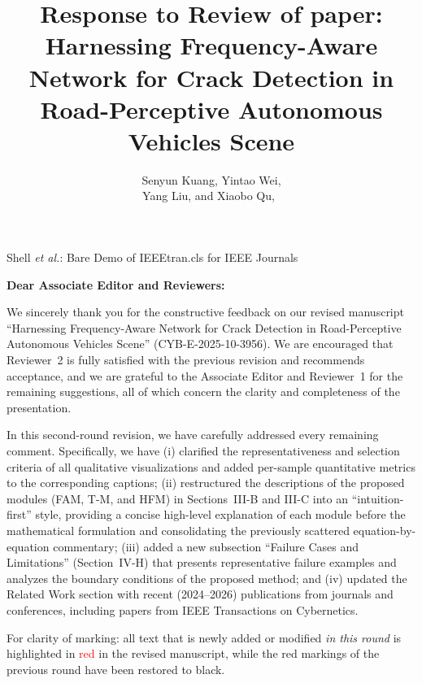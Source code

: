\documentclass[lettersize,journal,onecolumn,12pt]{IEEEtran}
\begin{document}

\title{Response to Review of paper:\\
Harnessing Frequency-Aware Network for Crack Detection in Road-Perceptive Autonomous Vehicles Scene}

\author{Senyun Kuang, Yintao Wei,

Yang Liu, and Xiaobo Qu,~
}

%
{Shell \MakeLowercase{\textit{et al.}}: Bare Demo of IEEEtran.cls for IEEE Journals}

\maketitle

\textbf{Dear Associate Editor and Reviewers:}

We sincerely thank you for the constructive feedback on our revised manuscript
``Harnessing Frequency-Aware Network for Crack Detection in Road-Perceptive Autonomous Vehicles Scene''
(CYB-E-2025-10-3956).
We are encouraged that Reviewer~2 is fully satisfied with the previous revision and recommends acceptance,
and we are grateful to the Associate Editor and Reviewer~1 for the remaining suggestions,
all of which concern the clarity and completeness of the presentation.

In this second-round revision, we have carefully addressed every remaining comment. Specifically, we have
(i) clarified the representativeness and selection criteria of all qualitative visualizations and added
per-sample quantitative metrics to the corresponding captions;
(ii) restructured the descriptions of the proposed modules (FAM, T-M, and HFM) in Sections~III-B and III-C
into an ``intuition-first'' style, providing a concise high-level explanation of each module before the mathematical
formulation and consolidating the previously scattered equation-by-equation commentary;
(iii) added a new subsection ``Failure Cases and Limitations'' (Section~IV-H) that presents representative failure
examples and analyzes the boundary conditions of the proposed method; and
(iv) updated the Related Work section with recent (2024--2026) publications from journals and conferences,
including papers from IEEE Transactions on Cybernetics.

For clarity of marking: all text that is newly added or modified \emph{in this round} is highlighted in
\textcolor{red}{red} in the revised manuscript, while the red markings of the previous round have been restored
to black.
\end{document}
